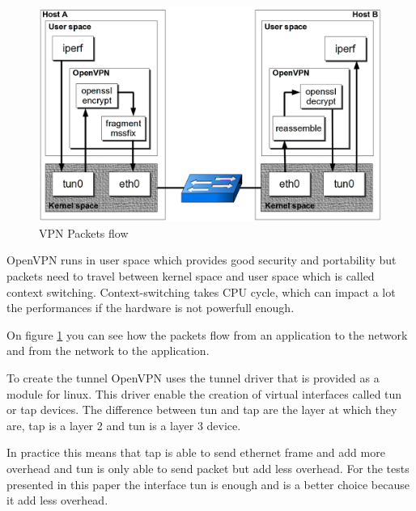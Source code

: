   \begin{figure}[h!]
    \centering
    \includegraphics[width=1\textwidth]{./images/packetflow.png}
    \caption{VPN Packets flow}
    \label{packetFlow}
  \end{figure}

  OpenVPN runs in user space which provides good security and portability but packets need to travel between kernel space and user space which is called context switching.
  Context-switching takes CPU cycle, which can impact a lot the performances if the hardware is not powerfull enough.

  On figure \ref{packetFlow} you can see how the packets flow from an application to the network and from the network to the application.

  To create the tunnel OpenVPN uses the tunnel driver that is provided as a module for linux. This driver enable the creation of virtual interfaces called tun or tap devices. The difference between tun and tap are the
  layer at which they are, tap is a layer 2 and tun is a layer 3 device.

  In practice this means that tap is able to send ethernet frame and add more overhead and tun is only able to send packet but add less overhead. For the tests presented in this paper the interface tun is enough and is a better
  choice because it add less overhead.
